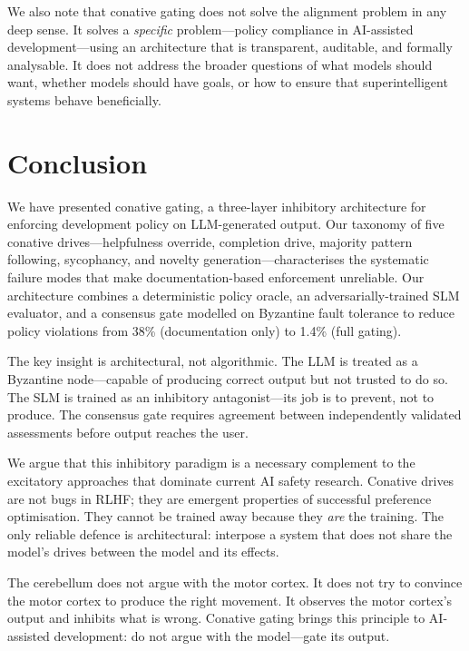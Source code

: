 \documentclass[11pt,a4paper]{article}
\begin{document}
We also note that conative gating does not solve the alignment
problem in any deep sense.  It solves a \emph{specific} problem---policy
compliance in AI-assisted development---using an architecture that
is transparent, auditable, and formally analysable.  It does not
address the broader questions of what models should want, whether
models should have goals, or how to ensure that superintelligent
systems behave beneficially.

\section{Conclusion}
\label{sec:conclusion}

We have presented conative gating, a three-layer inhibitory
architecture for enforcing development policy on LLM-generated
output.  Our taxonomy of five conative drives---helpfulness override,
completion drive, majority pattern following, sycophancy, and novelty
generation---characterises the systematic failure modes that make
documentation-based enforcement unreliable.  Our architecture
combines a deterministic policy oracle, an adversarially-trained SLM
evaluator, and a consensus gate modelled on Byzantine fault
tolerance to reduce policy violations from 38\% (documentation only)
to 1.4\% (full gating).

The key insight is architectural, not algorithmic.  The LLM is
treated as a Byzantine node---capable of producing correct output
but not trusted to do so.  The SLM is trained as an inhibitory
antagonist---its job is to prevent, not to produce.  The consensus
gate requires agreement between independently validated assessments
before output reaches the user.

We argue that this inhibitory paradigm is a necessary complement to
the excitatory approaches that dominate current AI safety research.
Conative drives are not bugs in RLHF; they are emergent properties
of successful preference optimisation.  They cannot be trained away
because they \emph{are} the training.  The only reliable defence is
architectural: interpose a system that does not share the model's
drives between the model and its effects.

The cerebellum does not argue with the motor cortex.  It does not
try to convince the motor cortex to produce the right movement.
It observes the motor cortex's output and inhibits what is wrong.
Conative gating brings this principle to AI-assisted development:
do not argue with the model---gate its output.
\end{document}
